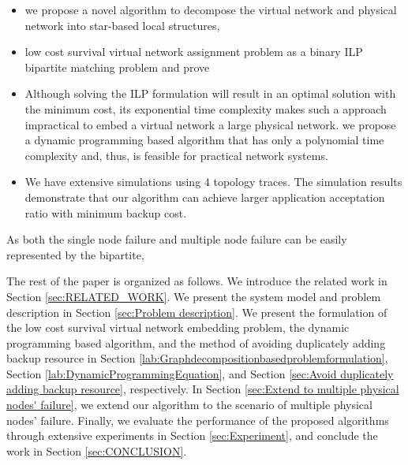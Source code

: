 \begin{itemize}
  \item {} we propose a novel algorithm to decompose the virtual network and physical network into star-based local structures, 
      \item  {} low cost survival virtual network assignment problem as a binary ILP bipartite matching problem and  prove 
  \item Although solving the ILP formulation will result in an optimal solution with the minimum cost, its exponential time complexity makes such a approach impractical to embed a virtual network  a large physical network.  we propose a dynamic programming based algorithm that has only a polynomial time complexity and, thus, is feasible for practical network systems.
  \item We have  extensive simulations using 4 topology traces. The simulation results demonstrate that our algorithm can achieve larger application acceptation ratio  with minimum backup cost.
\end{itemize}
 As both the single node failure and multiple node failure can be easily represented by the bipartite,  

The rest of the paper is organized as follows. We introduce the related work in Section \ref{sec:RELATED_WORK}.  We present the system model and problem description in Section \ref{sec:Problem description}.  We present the formulation of the low cost survival virtual network embedding problem, the dynamic programming based algorithm, and the method of avoiding duplicately adding backup resource in Section \ref{lab:Graphdecompositionbasedproblemformulation}, Section \ref{lab:DynamicProgrammingEquation}, and Section \ref{sec:Avoid  duplicately adding backup resource}, respectively.
In Section \ref{sec:Extend to multiple physical nodes' failure},  we extend our algorithm to the
scenario of multiple physical nodes' failure. Finally, we evaluate the performance of the proposed algorithms through extensive experiments in Section \ref{sec:Experiment}, and conclude the work in Section \ref{sec:CONCLUSION}.


